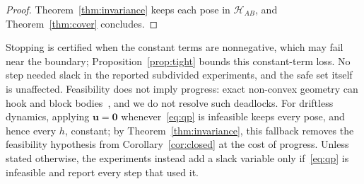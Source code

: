 \documentclass[journal]{IEEEtran}
\theoremstyle{definition}
\begin{document}
\begin{proof}
Theorem~\ref{thm:invariance} keeps each pose in $\mathcal H_{AB}$, and Theorem~\ref{thm:cover}
concludes.
\end{proof}
Stopping is certified when the constant terms are nonnegative, which may fail near the boundary;
Proposition~\ref{prop:tight} bounds this constant-term loss. No step needed slack in the reported
subdivided experiments, and the safe set itself is unaffected.
Feasibility does not imply progress: exact non-convex geometry can hook and block
bodies~\cite{reis2020undesirable}, and we do not resolve such deadlocks. For driftless dynamics,
applying $\mathbf u=\mathbf 0$ whenever~\eqref{eq:qp} is infeasible keeps every pose, and hence
every $h$, constant; by Theorem~\ref{thm:invariance}, this fallback removes the feasibility
hypothesis from Corollary~\ref{cor:closed} at the cost of progress. Unless stated otherwise, the
experiments instead add a slack variable only if~\eqref{eq:qp} is infeasible and report every step
that used it.
\end{document}

